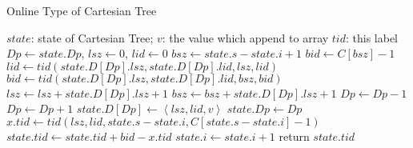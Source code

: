 \begin{algorithm}[!thb]
  \caption{Online Type of Cartesian Tree}
  \label{alg:cartesian-encode-online}
  \begin{algorithmic}[1]
  \Require
      $\mathit{state}$: state of Cartesian Tree;
      $v$: the value which append to array
  \Ensure
      $\mathit{tid}$: this label
  \State $\textit{Dp} \gets \textit{state}.\textit{Dp}$, $\textit{lsz} \gets 0$, $\textit{lid} \gets 0$
  \State $\textit{bsz} \gets \textit{state}.\textit{s} - \textit{state}.\textit{i} + 1$
  \State $\textit{bid} \gets C[\textit{bsz}] - 1$
    \State $\textit{lid} \gets \textit{tid}(\textit{state}.D[\textit{Dp}].\textit{lsz}, \textit{state}.D[\textit{Dp}].\textit{lid}, \textit{lsz}, \textit{lid})$
    \State $\textit{bid} \gets \textit{tid}(\textit{state}.D[\textit{Dp}].\textit{lsz}, \textit{state}.D[\textit{Dp}].\textit{lid}, \textit{bsz}, \textit{bid})$
    \State $\textit{lsz} \gets \textit{lsz} + \textit{state}.D[\textit{Dp}].\textit{lsz}+1$
    \State $\textit{bsz} \gets \textit{bsz} + \textit{state}.D[\textit{Dp}].\textit{lsz}+1$
    \State $\textit{Dp} \gets \textit{Dp} - 1$
  \EndWhile
  \State $\textit{Dp} \gets \textit{Dp} + 1$
  \State $\textit{state}.D[\textit{Dp}] \gets \left \langle \textit{lsz}, \textit{lid}, \textit{v} \right \rangle$
  \State $\textit{state}.\textit{Dp} \gets \textit{Dp}$
  \State $x.\textit{tid} \gets \textit{tid}(\textit{lsz}, \textit{lid}, \textit{state}.s-\textit{state}.i, C[\textit{state}.s-\textit{state}.i]-1)$
  \State $\textit{state}.\textit{tid} \gets \textit{state}.\textit{tid} + \textit{bid} - x.\textit{tid}$
  \State $\textit{state}.i \gets \textit{state}.i + 1$
  \State return $\textit{state}.\textit{tid}$
  \end{algorithmic}
\end{algorithm}